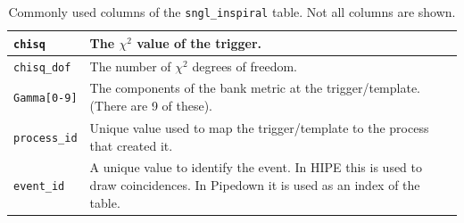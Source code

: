 \begin{table}[p]
\begin{tabular}{l | p{10cm}}
\hline
\texttt{chisq}      & The $\chi^2$ value of the trigger. \\
\hline
\texttt{chisq\_dof} & The number of $\chi^2$ degrees of freedom. \\
\hline
\texttt{Gamma[0-9]} & The components of the bank metric at the trigger/template. (There are 9 of these). \\
\hline
\texttt{process\_id}        &   Unique value used to map the trigger/template to the process that created it. \\
\hline
\texttt{event\_id}  & A unique value to identify the event. In \ac{HIPE} this is used to draw coincidences. In Pipedown it is used as an index of the table.
\end{tabular}
\caption{Commonly used columns of the \texttt{sngl\_inspiral} table. Not all columns are shown.}
\end{table}

